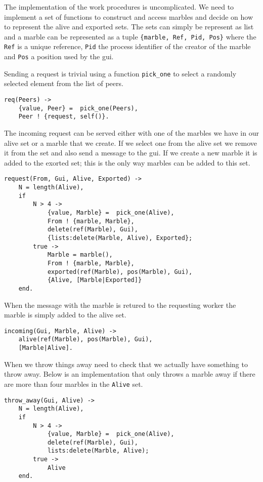\documentclass[a4paper,11pt]{article}
\begin{document}
The implementation of the work procedures is uncomplicated. We need to
implement a set of functions to construct and access marbles and
decide on how to represent the alive and exported sets. The sets can
simply be represent as list and a marble can be represented as a tuple
{\tt\{marble, Ref, Pid, Pos\}} where the {\tt Ref} is a unique
reference, {\tt Pid} the process identifier of the creator of the
marble and {\tt Pos} a position used by the gui. 

Sending a request is trivial using a function {\tt pick\_one} to select
a randomly selected element from the list of peers.

\begin{verbatim}
req(Peers) ->
    {value, Peer} =  pick_one(Peers),
    Peer ! {request, self()}.

\end{verbatim}

The incoming request can be served either with one of the marbles we
have in our alive set or a marble that we create. If we select one
from the alive set we remove it from the set and also send a message
to the gui. If we create a new marble it is added to the exorted set;
this is the only way marbles can be added to this set. 

\begin{verbatim}
request(From, Gui, Alive, Exported) ->
    N = length(Alive),
    if 
        N > 4 ->
            {value, Marble} =  pick_one(Alive),
            From ! {marble, Marble},
            delete(ref(Marble), Gui),
            {lists:delete(Marble, Alive), Exported};
        true ->
            Marble = marble(),
            From ! {marble, Marble},
            exported(ref(Marble), pos(Marble), Gui),
            {Alive, [Marble|Exported]}
    end.
\end{verbatim}

When the message with the marble is retured to the requesting worker
the marble is simply added to the alive set. 

\begin{verbatim}
incoming(Gui, Marble, Alive) ->
    alive(ref(Marble), pos(Marble), Gui),
    [Marble|Alive].
\end{verbatim}

When we throw things away need to check that we actually have
something to throw away. Below is an implementation that only throws a
marble away if there are more than four marbles in the {\tt Alive}
set.

\begin{verbatim}
throw_away(Gui, Alive) ->
    N = length(Alive),
    if 
        N > 4 ->
            {value, Marble} =  pick_one(Alive),
            delete(ref(Marble), Gui),
            lists:delete(Marble, Alive);
        true ->
            Alive
    end.
\end{verbatim}
\end{document}
